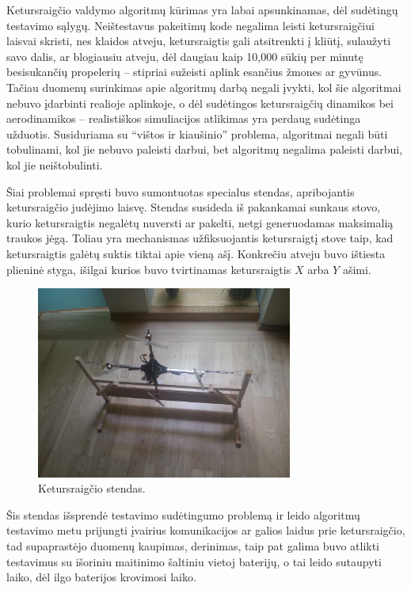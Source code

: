 \documentclass[12pt, a4paper, lithuanian, final]{article}
\begin{document}
Ketursraigčio valdymo algoritmų kūrimas yra labai apsunkinamas, dėl sudėtingų testavimo sąlygų.
Neištestavus pakeitimų kode negalima leisti ketursraigčiui laisvai skristi, nes klaidos atveju, ketursraigtis gali atsitrenkti į kliūtį, sulaužyti savo dalis, ar blogiausiu atveju, dėl daugiau kaip 10,000 sūkių per minutę besisukančių propelerių -- stipriai sužeisti aplink esančius žmones ar gyvūnus.
Tačiau duomenų surinkimas apie algoritmų darbą negali įvykti, kol šie algoritmai nebuvo įdarbinti realioje aplinkoje, o dėl sudėtingos ketursraigčių dinamikos bei aerodinamikos -- realistiškos simuliacijos atlikimas yra perdaug sudėtinga užduotis.
Susiduriama su "`vištos ir kiaušinio"' problema, algoritmai negali būti tobulinami, kol jie nebuvo paleisti darbui, bet algoritmų negalima paleisti darbui, kol jie neištobulinti.

Šiai problemai spręsti buvo sumontuotas specialus stendas, apribojantis ketursraigčio judėjimo laisvę.
Stendas susideda iš pakankamai sunkaus stovo, kurio ketursraigtis negalėtų nuversti ar pakelti, netgi generuodamas maksimalią traukos jėgą.
Toliau yra mechanismas užfiksuojantis ketursraigtį stove taip, kad ketursraigtis galėtų suktis tiktai apie vieną ašį.
Konkrečiu atveju buvo ištiesta plieninė styga, išilgai kurios buvo tvirtinamas ketursraigtis $X$ arba $Y$ ašimi.

\begin{figure}[H]
\begin{center}
\includegraphics[width=0.75\textwidth]{img/frame.jpg}
\caption{Ketursraigčio stendas.}
\end{center}
\end{figure}



Šis stendas išsprendė testavimo sudėtingumo problemą ir leido algoritmų testavimo metu prijungti įvairius komunikacijos ar galios laidus prie ketursraigčio, tad supaprastėjo duomenų kaupimas, derinimas, taip pat galima buvo atlikti testavimus su išoriniu maitinimo šaltiniu vietoj baterijų, o tai leido sutaupyti laiko, dėl ilgo baterijos krovimosi laiko.
\end{document}
